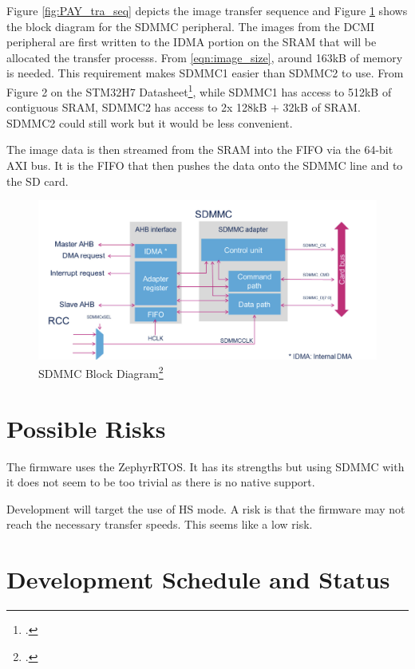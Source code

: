 \documentclass[12pt,a4paper]{article}
\begin{document}
    Figure \ref{fig:PAY_tra_seq} depicts the image transfer sequence and Figure 
    \ref{fig:SDMMC_blo_dia} shows the block diagram for the SDMMC peripheral. 
    The images from the DCMI peripheral are first written to the IDMA portion on the SRAM 
    that will be allocated the transfer processs. From \eqref{eqn:image_size}, around 163kB of 
    memory is needed. This requirement makes SDMMC1 easier than SDMMC2 to use. From Figure 2 on 
    the STM32H7 Datasheet\footcite{H7_DS}, while SDMMC1 has access to 512kB of contiguous SRAM, 
    SDMMC2 has access to 2x 128kB + 32kB of SRAM. SDMMC2 could still work but it would be less 
    convenient. 

    The image data is then streamed from the SRAM into the FIFO via the 64-bit AXI bus. 
    It is the FIFO that then pushes the data onto the SDMMC line and to the SD card. 

    \begin{figure}[H]
        \centering
        \includegraphics[width=0.98\linewidth]{../figures/SDMMC_block_diagram.png}
        \caption{SDMMC Block Diagram\footcite{H7_SDMMC_ref}}
        \label{fig:SDMMC_blo_dia}
    \end{figure}


    \section{Possible Risks}
    The firmware uses the ZephyrRTOS. It has its strengths but using SDMMC with it 
    does not seem to be too trivial as there is no native support. 

    Development will target the use of HS mode. A risk is that the firmware may not 
    reach the necessary transfer speeds. This seems like a low risk. 

    \section{Development Schedule and Status}
\end{document}
